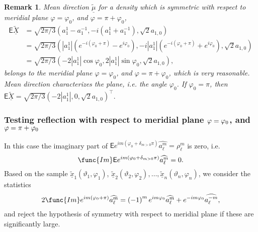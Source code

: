 \documentclass[preprint,11pt,a4paper]{elsarticle}
\newtheorem{remark}[theorem]{Remark}
\begin{document}
\begin{remark}
Mean direction $\underline{\widetilde{\mu}}$ for a density which is
symmetric with respect to meridial plane $\varphi=\varphi_{0}$, and $%
\varphi=\pi +\varphi_{0}$, 
\begin{align*}
\mathsf{E}\widetilde{\underline{X}} & =\sqrt{2\pi/3}\left(
a_{1}^{1}-a_{1}^{-1},-i\left( a_{1}^{1}+a_{1}^{-1}\right) ,\sqrt{2}%
a_{1,0}\right) \\
& =\sqrt{2\pi/3}\left( \left\vert a_{1}^{1}\right\vert \left( e^{-i\left(
\varphi_{0}+\pi\right) }-e^{i\varphi_{0}}\right) ,-i\left\vert
a_{1}^{1}\right\vert \left( e^{-i\left( \varphi_{0}+\pi\right) }+e^{i\varphi
_{0}}\right) ,\sqrt{2}a_{1,0}\right) \\
& =\sqrt{2\pi/3}\left( -2\left\vert a_{1}^{1}\right\vert \cos\varphi
_{0},2\left\vert a_{1}^{1}\right\vert \sin\varphi_{0},\sqrt{2}a_{1,0}\right)
,
\end{align*}
belongs to the meridial plane $\varphi=\varphi_{0}$, and $\varphi=\pi
+\varphi_{0}$, which is very reasonable. Mean direction characterizes the
plane, i.e. the angle $\varphi_{0}$. If $\varphi_{0}=\pi$, then $\mathsf{E}%
\widetilde{\underline{X}}=\sqrt{2\pi/3}\left( -2\left\vert
a_{1}^{1}\right\vert ,0,\sqrt{2}a_{1,0}\right) ^{\top}.$
\end{remark}

\subsubsection{Testing reflection with respect to meridial plane $\protect%
\varphi=\protect\varphi_{0}$, and $\protect\varphi=\protect\pi+\protect%
\varphi_{0}$}

In this case the imaginary part of $\mathsf{E}e^{im\left(
\varphi_{0}+\delta_{m>0}\pi\right) }\widehat{a_{\ell}^{m}}=\rho_{\ell}^{m}$
is zero, i.e. 
\begin{equation*}
\func{Im}\mathsf{E}e^{im\left( \varphi_{0}+\delta_{m>0}\pi\right) }\widehat{%
a_{\ell}^{m}}=0.
\end{equation*}
Based on the sample $\underline{\widetilde{x}}_{1}\left( \vartheta
_{1},\varphi_{1}\right) $, $\underline{\widetilde{x}}_{2}\left(
\vartheta_{2},\varphi_{2}\right) ,\ldots,\underline{\widetilde{x}}_{n}\left(
\vartheta_{n},\varphi_{n}\right) $, we consider the statistics%
\begin{equation*}
2\func{Im}e^{im\left( \varphi_{0}+\pi\right) }\widehat{a_{\ell}^{m}}=\left(
-1\right) ^{m}e^{im\varphi_{0}}\widehat{a_{\ell}^{m}}+e^{-im\varphi_{0}}%
\widehat{a_{\ell}^{-m}},
\end{equation*}
and reject the hypothesis of symmetry with respect to meridial plane if
these are significantly large.
\end{document}
